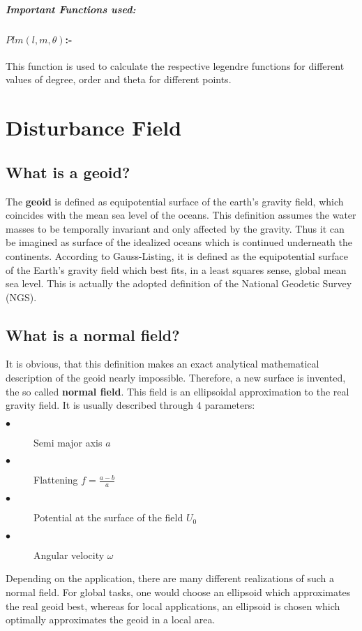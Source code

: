 \documentclass[a4paper,12pt]{article}
\begin{document}
\newpage

\subparagraph{Important Functions used:}   



\paragraph{$Plm(l,m,\theta)$:-} This function is used to calculate the respective legendre functions for different values of degree, order and theta for different points.





\section{Disturbance Field}
\subsection{What is a  geoid?}
The \textbf{geoid} is defined as equipotential surface of the earth’s gravity field, which coincides with the mean sea level of the oceans. This definition assumes the water masses to be temporally invariant and only affected by the gravity. Thus it can be imagined as surface of the idealized oceans which is continued underneath the continents. According to Gauss-Listing, it is defined as the equipotential surface of the Earth’s gravity field which best fits, in a least squares sense, global mean sea level. This is actually the adopted definition of the National Geodetic Survey (NGS).\\

\subsection{What is a normal field?}
It is obvious, that this definition makes an exact analytical mathematical description of the geoid nearly impossible. Therefore, a new surface is invented, the so called \textbf{normal field}. This field is an ellipsoidal approximation to the real gravity field. It is usually described through 4 parameters:
\begin{description}
\item[$\bullet$]Semi major axis $a$
\item[$\bullet$]Flattening $f=\frac{a-b}{a}$
\item[$\bullet$]Potential at the surface of the field $U_0$
\item[$\bullet$]Angular velocity $\omega$
\end{description}
Depending on the application, there are many different realizations of such a normal field. For global tasks, one would choose an ellipsoid which approximates the real geoid
best, whereas for local applications, an ellipsoid is chosen which optimally approximates the geoid in a local area.\\
\end{document}
